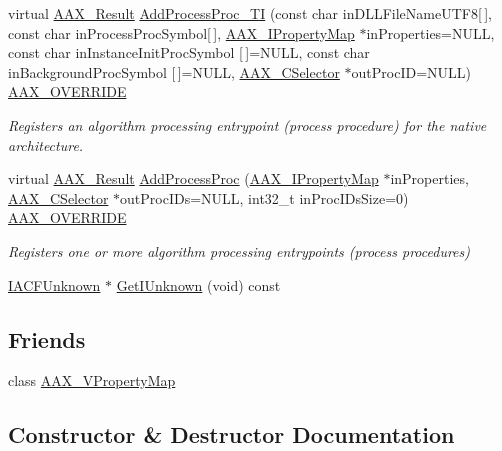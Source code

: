 \begin{DoxyCompactItemize}
virtual \mbox{\hyperlink{a00392_a4d8f69a697df7f70c3a8e9b8ee130d2f}{A\+A\+X\+\_\+\+Result}} \mbox{\hyperlink{a01901_ad9957b836cf89a8f82dbb7eab9953fc5}{Add\+Process\+Proc\+\_\+\+TI}} (const char in\+D\+L\+L\+File\+Name\+U\+T\+F8\mbox{[}$\,$\mbox{]}, const char in\+Process\+Proc\+Symbol\mbox{[}$\,$\mbox{]}, \mbox{\hyperlink{a01869}{A\+A\+X\+\_\+\+I\+Property\+Map}} $\ast$in\+Properties=N\+U\+LL, const char in\+Instance\+Init\+Proc\+Symbol \mbox{[}$\,$\mbox{]}=N\+U\+LL, const char in\+Background\+Proc\+Symbol \mbox{[}$\,$\mbox{]}=N\+U\+LL, \mbox{\hyperlink{a00392_aeaf9b387f902c50a8360ff423f4a1f23}{A\+A\+X\+\_\+\+C\+Selector}} $\ast$out\+Proc\+ID=N\+U\+LL) \mbox{\hyperlink{a00392_ac2f24a5172689ae684344abdcce55463}{A\+A\+X\+\_\+\+O\+V\+E\+R\+R\+I\+DE}}
\begin{DoxyCompactList}\small\item\em Registers an algorithm processing entrypoint (process procedure) for the native architecture. \end{DoxyCompactList}\item 
virtual \mbox{\hyperlink{a00392_a4d8f69a697df7f70c3a8e9b8ee130d2f}{A\+A\+X\+\_\+\+Result}} \mbox{\hyperlink{a01901_a93702a420bd6d61187802ac09b223c03}{Add\+Process\+Proc}} (\mbox{\hyperlink{a01869}{A\+A\+X\+\_\+\+I\+Property\+Map}} $\ast$in\+Properties, \mbox{\hyperlink{a00392_aeaf9b387f902c50a8360ff423f4a1f23}{A\+A\+X\+\_\+\+C\+Selector}} $\ast$out\+Proc\+I\+Ds=N\+U\+LL, int32\+\_\+t in\+Proc\+I\+Ds\+Size=0) \mbox{\hyperlink{a00392_ac2f24a5172689ae684344abdcce55463}{A\+A\+X\+\_\+\+O\+V\+E\+R\+R\+I\+DE}}
\begin{DoxyCompactList}\small\item\em Registers one or more algorithm processing entrypoints (process procedures) \end{DoxyCompactList}\item 
\mbox{\hyperlink{a01409}{I\+A\+C\+F\+Unknown}} $\ast$ \mbox{\hyperlink{a01901_a337e62a995b4f098cc190ed6d4cc8d74}{Get\+I\+Unknown}} (void) const
\end{DoxyCompactItemize}
\subsection*{Friends}
\begin{DoxyCompactItemize}
\item 
class \mbox{\hyperlink{a01901_a4e23888818817a675e86dd4e71bd1ab1}{A\+A\+X\+\_\+\+V\+Property\+Map}}
\end{DoxyCompactItemize}


\subsection{Constructor \& Destructor Documentation}
\mbox{\label{a01901_ac7afc2d0da1ba680cfe5316facfff038}} 
